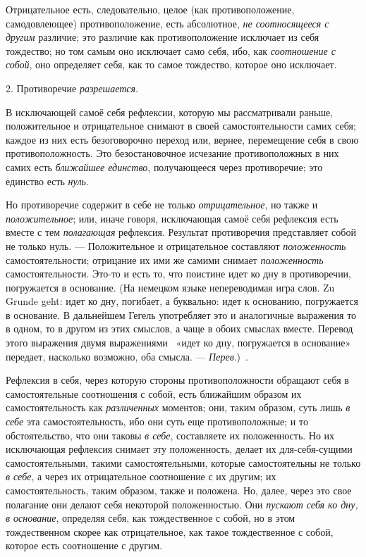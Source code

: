 Отрицательное есть, следовательно, целое (как противоположение,
самодовлеющее) противоположение, есть абсолютное,
{\em не соотносящееся с другим} различие; это различие
как противоположение исключает из себя тождество; но том самым оно
исключает само себя, ибо, как {\em соотношение с
собой}, оно определяет себя, как то самое тождество, которое оно исключает.


\bigskip

2. Противоречие {\em разрешается}.

В исключающей самоё себя рефлексии, которую мы рассматривали раньше,
положительное и отрицательное снимают в своей самостоятельности самих себя;
каждое из них есть безоговорочно переход или, вернее, перемещение себя в
свою противоположность. Это безостановочное исчезание противоположных в них
самих есть {\em ближайшее единство}, получающееся через
противоречие; это единство есть {\em нуль}.

Но противоречие содержит в себе не только
{\em отрицательное}, но также и
{\em положительное}; или, иначе говоря, исключающая
самоё себя рефлексия есть вместе с тем {\em полагающая}
рефлексия. Результат противоречия представляет собой не только нуль. —
Положительное и отрицательное составляют
{\em положенность} самостоятельности; отрицание их ими
же самими снимает {\em положенность} самостоятельности.
Это-то и есть то, что поистине идет ко дну в противоречии, погружается в
основание. (На немецком языке непереводимая игра слов. Zu Grunde geht: идет
ко дну, погибает, а буквально: идет к основанию, погружается в основание. В
дальнейшем Гегель употребляет это и аналогичные выражения то в одном, то в
другом из этих смыслов, а чаще в обоих смыслах вместе. Перевод этого
выражения двумя выражениями \ «идет ко дну, погружается в основание»
передает, насколько возможно, оба смысла. —
{\em Перев}.)~\label{bkm:Ref474666891}.

Рефлексия в себя, через которую стороны противоположности обращают себя в
самостоятельные соотношения с собой, есть ближайшим образом их
самостоятельность как {\em различенных} моментов; они,
таким образом, суть лишь {\em в себе} эта
самостоятельность, ибо они суть еще противоположные; и то обстоятельство,
что они таковы {\em в себе}, составляете их
положенность. Но их исключающая рефлексия снимает эту положенность, делает
их для-себя-сущими самостоятельными, такими самостоятельными, которые
самостоятельны не только {\em в себе}, а через их
отрицательное соотношение с их другим; их самостоятельность, таким образом,
также и положена. Но, далее, через это свое полагание они делают себя
некоторой положенностью. Они {\em пускают себя ко дну,
в основание}, определяя себя, как тождественное с собой, но в этом
тождественном скорее как отрицательное, как такое тождественное с собой,
которое есть соотношение с другим.


